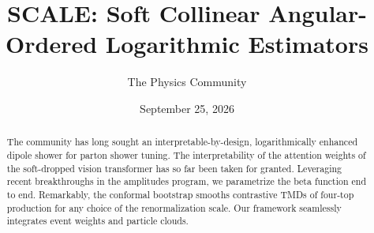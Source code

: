 \documentclass[11pt]{article}
\title{SCALE: Soft Collinear Angular-Ordered Logarithmic Estimators}
\author{The Physics Community}
\date{September 25, 2026}
\numberwithin{equation}{section}
\theoremstyle{definition}
\theoremstyle{remark}
\begin{document}
\maketitle
\begin{abstract}
The community has long sought an interpretable-by-design,
logarithmically enhanced dipole shower for parton shower tuning. The
interpretability of the attention weights of the soft-dropped vision
transformer has so far been taken for granted. Leveraging recent
breakthroughs in the amplitudes program, we parametrize the beta
function end to end. Remarkably, the conformal bootstrap smooths
contrastive TMDs of four-top production for any choice of the
renormalization scale. Our framework seamlessly integrates event weights
and particle clouds.
\end{abstract}
\tableofcontents




\nocite{*}


\end{document}
